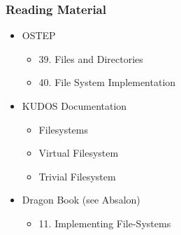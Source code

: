 \begin{frame}

\frametitle{Reading Material}

\begin{itemize}

\item OSTEP

\begin{itemize}

\item 39. Files and Directories

\item 40. File System Implementation

\end{itemize}

\item KUDOS Documentation

\begin{itemize}

\item Filesystems

\item Virtual Filesystem

\item Trivial Filesystem

\end{itemize}

\item Dragon Book (see Absalon)

\begin{itemize}

\item 11. Implementing File-Systems

\end{itemize}

\end{itemize}

\end{frame}
